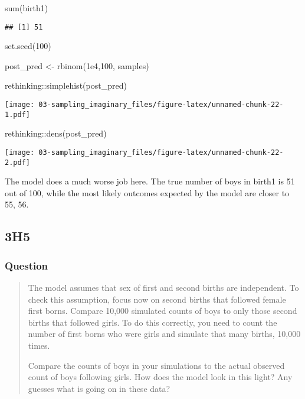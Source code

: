 \documentclass[
]{book}
\newenvironment{Shaded}{\begin{snugshade}}{\end{snugshade}}
\newcommand{\DecValTok}[1]{\textcolor[rgb]{0.00,0.00,0.81}{#1}}
\newcommand{\FloatTok}[1]{\textcolor[rgb]{0.00,0.00,0.81}{#1}}
\newcommand{\FunctionTok}[1]{\textcolor[rgb]{0.00,0.00,0.00}{#1}}
\newcommand{\NormalTok}[1]{#1}
\newcommand{\OtherTok}[1]{\textcolor[rgb]{0.56,0.35,0.01}{#1}}
\newcommand{\SpecialCharTok}[1]{\textcolor[rgb]{0.00,0.00,0.00}{#1}}
\begin{document}
\begin{Shaded}
\begin{Highlighting}[]
\FunctionTok{sum}\NormalTok{(birth1)}
\end{Highlighting}
\end{Shaded}

\begin{verbatim}
## [1] 51
\end{verbatim}

\begin{Shaded}
\begin{Highlighting}[]
\FunctionTok{set.seed}\NormalTok{(}\DecValTok{100}\NormalTok{)}

\NormalTok{post\_pred }\OtherTok{\textless{}{-}} \FunctionTok{rbinom}\NormalTok{(}\FloatTok{1e4}\NormalTok{,}\DecValTok{100}\NormalTok{, samples)}

\NormalTok{rethinking}\SpecialCharTok{::}\FunctionTok{simplehist}\NormalTok{(post\_pred)}
\end{Highlighting}
\end{Shaded}

\texttt{[image: 03-sampling\_imaginary\_files/figure-latex/unnamed-chunk-22-1.pdf]}

\begin{Shaded}
\begin{Highlighting}[]
\NormalTok{rethinking}\SpecialCharTok{::}\FunctionTok{dens}\NormalTok{(post\_pred)}
\end{Highlighting}
\end{Shaded}

\texttt{[image: 03-sampling\_imaginary\_files/figure-latex/unnamed-chunk-22-2.pdf]}

The model does a much worse job here. The true number of boys in birth1 is 51 out of 100, while the most likely outcomes expected by the model are closer to 55, 56.

\hypertarget{h5}{%
\subsection*{3H5}\label{h5}}

\hypertarget{question-32}{%
\subsubsection*{Question}\label{question-32}}

\begin{quote}
The model assumes that sex of first and second births are independent. To check this assumption, focus now on second births that followed female first borns. Compare 10,000 simulated counts of boys to only those second births that followed girls. To do this correctly, you need to count the number of first borns who were girls and simulate that many births, 10,000 times.

Compare the counts of boys in your simulations to the actual observed count of boys following girls. How does the model look in this light? Any guesses what is going on in these data?
\end{quote}
\end{document}
